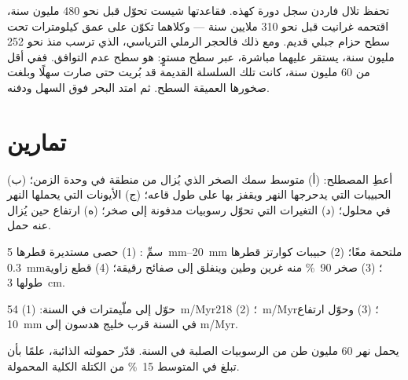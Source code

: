 تحفظ تلال فاردن سجل دورة كهذه. فقاعدتها شيست
تحوّل قبل نحو 480 مليون سنة، اقتحمه غرانيت قبل
نحو 310 ملايين سنة --- وكلاهما تكوّن على عمق كيلومترات تحت سطح
حزام جبلي قديم. ومع ذلك فالحجر الرملي الترياسي، الذي ترسب منذ نحو 252
مليون سنة، يستقر عليهما مباشرة، عبر سطح مستوٍ: هو سطح
عدم التوافق. ففي أقل من 60 مليون سنة، كانت تلك السلسلة القديمة قد بُريت
حتى صارت سهلًا وبلغت صخورها العميقة السطح. ثم امتد البحر
فوق السهل ودفنه.

\section{تمارين}

\begin{exercise}[$\star$]\label{exo:g12:destruction-of-mountains:1}
أعطِ المصطلح: (أ) متوسط سمك الصخر الذي يُزال من منطقة في وحدة
الزمن؛ (ب) الحبيبات التي يدحرجها النهر ويقفز بها على طول قاعه؛ (ج)
الأيونات التي يحملها النهر في محلول؛ (د) التغيرات التي تحوّل رسوبيات مدفونة
إلى صخر؛ (ه) ارتفاع  حين يُزال عنه حمل.
\end{exercise}

\begin{exercise}[$\star$]\label{exo:g12:destruction-of-mountains:2}
سمِّ : (1) حصى مستديرة قطرها \qtyrange{5}{20}{mm}
ملتحمة معًا؛ (2) حبيبات كوارتز قطرها \qty{0.3}{mm}؛ (3) صخر
\qty{90}{\percent} منه غرين وطين وينفلق إلى صفائح رقيقة؛ (4) قطع
زاوية طولها \qty{3}{cm}.
\end{exercise}

\begin{exercise}[$\star$]\label{exo:g12:destruction-of-mountains:3}
حوّل إلى ملّيمترات في السنة: (1) \qty{54}{m/Myr}؛ (2) \qty{218}{m/Myr}؛
(3) وحوّل ارتفاع \qty{10}{mm} في السنة قرب خليج هدسون إلى \unit{m/Myr}.
\end{exercise}

\begin{exercise}[$\star$]\label{exo:g12:destruction-of-mountains:4}
يحمل نهر 60 مليون طن من الرسوبيات الصلبة في السنة. قدّر
حمولته الذائبة، علمًا بأن  تبلغ في المتوسط
\qty{15}{\percent} من الكتلة الكلية المحمولة.
\end{exercise}

